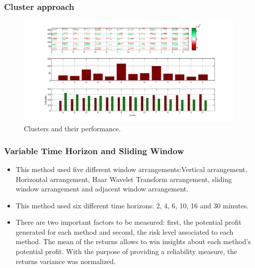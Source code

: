 \documentclass{beamer}
\begin{document}
\begin{frame}
\frametitle{Cluster approach}
\begin{figure}
	\centering
		\includegraphics[scale=0.25]{results.png}
		\caption{Clusters and their performance.}
	\label{fig:results}
\end{figure}
\end{frame}

\begin{frame}
\frametitle{Variable Time Horizon and Sliding Window}
\begin{itemize}
	\item This method used five different window arrangements:Vertical arrangement, Horizontal arrangement, Haar Wavelet Transform arrangement, sliding window arrangement and adjacent window arrangement.
	\item  This method used six different time horizons: 2, 4, 6, 10, 16 and 30
minutes.
	\item There are two important factors to be measured: first, the potential profit generated for each method and second, the risk level associated to each method. The mean of the returns allows to win insights about each method’s potential profit. With the purpose of providing a reliability measure, the returns variance was normalized.
\end{itemize}
\end{frame}
\end{document}
